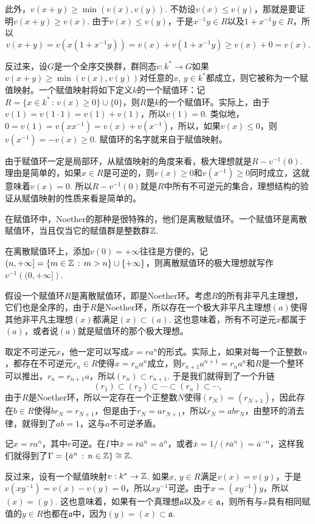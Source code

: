此外，$v(x+y)\geq \min\left(v(x),v(y)\right)$. 不妨设$v(x)\leq v(y)$，那就是要证明$v(x+y)\geq v(x)$. 由于$v(x)\leq v(y)$，于是$x^{-1}y\in R$以及$1+x^{-1}y\in R$，所以
\[
	v(x+y)=v(x(1+x^{-1}y))=v(x)+v(1+x^{-1}y)\geq v(x)+0=v(x).
\]

\para 反过来，设$G$是一个全序交换群，群同态$v:k^*\to G$如果$v(x+y)\geq \min\left(v(x),v(y)\right)$对任意的$x$, $y\in k^*$都成立，则它被称为一个赋值映射。一个赋值映射将如下定义$k$的一个赋值环：记$R=\{x\in k^* \,:\, v(x)\geq 0\}\cup \{0\}$，则$R$是$k$的一个赋值环。实际上，由于$v(1)=v(1\cdot 1)=v(1)+v(1)$，所以$v(1)=0$. 类似地，$0=v(1)=v(xx^{-1})=v(x)+v(x^{-1})$，所以，如果$v(x)\leq 0$，则$v(x^{-1})=-v(x)\geq 0$. 赋值环的名字就来自于赋值映射。

由于赋值环一定是局部环，从赋值映射的角度来看，极大理想就是$R-v^{-1}(0)$. 理由是简单的，如果$x\in R$是可逆的，则$v(x)\geq 0$和$v(x^{-1})\geq 0$同时成立，这就意味着$v(x)=0$. 所以$R-v^{-1}(0)$就是$R$中所有不可逆元的集合，理想结构的验证从赋值映射的性质来看是简单的。

\pro 在赋值环中，Noether的那种是很特殊的，他们是离散赋值环。一个赋值环是离散赋值环，当且仅当它的赋值群是整数群$\mathbb{Z}$. 

在离散赋值环上，添加$v(0)=+\infty$往往是方便的，记$(n,+\infty]=\{m\in \mathbb{Z}\,:\, m>n\}\cup \{+\infty\}$，则离散赋值环的极大理想就写作$v^{-1}\left((0,+\infty]\right)$. 

\proof
	假设一个赋值环$R$是离散赋值环，即是Noether环。考虑$R$的所有非平凡主理想，它们也是全序的，由于$R$是Noether环，所以存在一个极大非平凡主理想$(a)$使得其他非平凡主理想$(x)$都满足$(x)\subset (a)$. 这也意味着，所有不可逆元$x$都属于$(a)$，或者说$(a)$就是赋值环的那个极大理想。

	取定不可逆元$x$，他一定可以写成$x=ra^n$的形式。实际上，如果对每一个正整数$n$，都存在不可逆元$r_n\in R$使得$x=r_na^n$成立，则$r_{n+1}a^{n+1}=r_n a^n$和$R$是一个整环可以推出，$r_n = r_{n+1}a$，所以$(r_n)\subset r_{n+1}$. 于是我们就得到了一个升链
	\[
	(r_1)\subset (r_2)\subset \cdots \subset (r_n)\subset \cdots,
	\]
	由于$R$是Noether环，所以一定存在一个正整数$N$使得$(r_N)=(r_{N+1})$，因此存在$b\in R$使得$br_N=r_{N+1}$，但是由于$r_N=ar_{N+1}$，所以$r_N=abr_N$，由整环的消去律，就得到了$ab=1$，这与$a$不可逆矛盾。

	记$x=ra^n$，其中$r$可逆。在$\Gamma$中$\bar{x}=\bar{r}\bar{a}^n=\bar{a}^n$，或者$\bar{x}=1/(\bar{r}\bar{a}^n)=\bar{a}^{-n}$，这样我们就得到了$\Gamma=\{\bar{a}^n\,:\, n\in \mathbb{Z}\}\cong \mathbb{Z}$.

	反过来，设有一个赋值映射$v:k^*\to \mathbb{Z}$. 如果$x$, $y\in R$满足$v(x)=v(y)$，于是$v(xy^{-1})=v(x)-v(y)=0$，所以$xy^{-1}$可逆。由于$x=(xy^{-1})y$，所以$(x)=(y)$. 这也意味着，如果有一个真理想$\mathfrak{a}$以及$x\in \mathfrak{a}$，则所有与$x$具有相同赋值的$y\in R$也都在$\mathfrak{a}$中，因为$(y)=(x)\subset \mathfrak{a}$.

